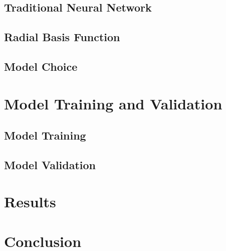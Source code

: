 \subsection{Traditional Neural Network}

\subsection{Radial Basis Function}

\subsection{Model Choice}

\section{Model Training and Validation}

\subsection{Model Training}

\subsection{Model Validation}

\section{Results}

\section{Conclusion}
